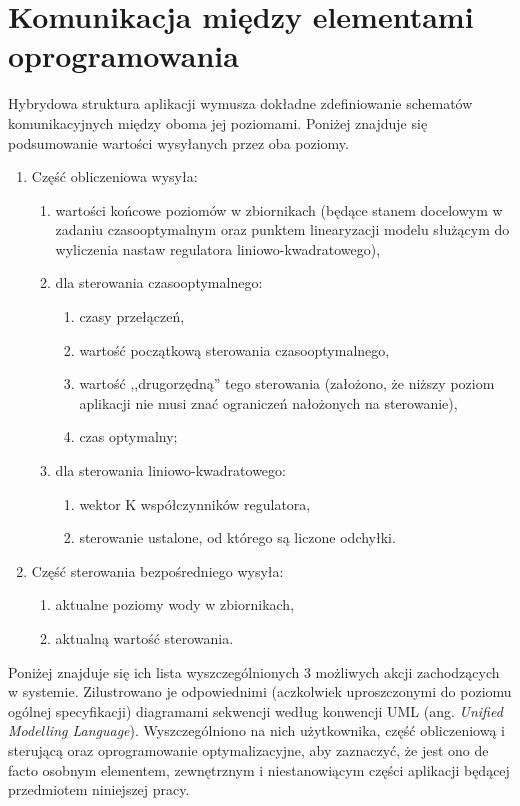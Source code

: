 \section{Komunikacja między elementami oprogramowania}
\label{sec:komunikacja}

Hybrydowa struktura aplikacji wymusza dokładne zdefiniowanie schematów komunikacyjnych między oboma jej poziomami.
Poniżej znajduje się podsumowanie wartości wysyłanych przez oba poziomy.

\begin{enumerate} 
    \item Część obliczeniowa wysyła:
    \begin{enumerate}
        \item wartości końcowe poziomów w zbiornikach (będące stanem docelowym w zadaniu czasooptymalnym oraz punktem linearyzacji modelu służącym do wyliczenia nastaw regulatora liniowo-kwadratowego),
        \item dla sterowania czasooptymalnego:
        \begin{enumerate}
            \item czasy przełączeń,
            \item wartość początkową sterowania czasooptymalnego,
            \item wartość ,,drugorzędną'' tego sterowania (założono, że niższy poziom aplikacji nie musi znać ograniczeń nałożonych na sterowanie),
            \item czas optymalny;
        \end{enumerate}
        \item dla sterowania liniowo-kwadratowego:
        \begin{enumerate}
            \item wektor K współczynników regulatora,
            \item sterowanie ustalone, od którego są liczone odchyłki.
        \end{enumerate}
    \end{enumerate}
    \item Część sterowania bezpośredniego wysyła:
    \begin{enumerate}
        \item aktualne poziomy wody w zbiornikach,
        \item aktualną wartość sterowania.
    \end{enumerate}
\end{enumerate}

Poniżej znajduje się ich lista wyszczególnionych 3 możliwych akcji zachodzących w systemie. Zilustrowano je odpowiednimi (aczkolwiek uproszczonymi do poziomu ogólnej specyfikacji) diagramami sekwencji według konwencji UML (ang. \emph{Unified Modelling Language}). Wyszczególniono na nich użytkownika, część obliczeniową i sterującą oraz oprogramowanie optymalizacyjne, aby zaznaczyć, że jest ono de facto osobnym elementem, zewnętrznym i niestanowiącym części aplikacji będącej przedmiotem niniejszej pracy.

